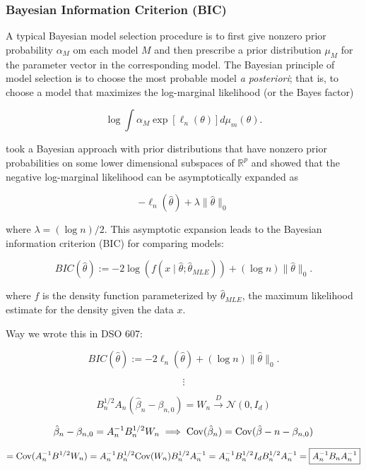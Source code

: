 \subsubsection{Bayesian Information Criterion (BIC)}\label{linreg.bic}

A typical Bayesian model selection procedure is to first give nonzero prior probability \(\alpha_M\) om each model \(M\) and then prescribe a prior distribution \(\mu_M\) for the parameter vector in the corresponding model. The Bayesian principle of model selection is to choose the most probable model \textit{a posteriori}; that is, to choose a model that maximizes the log-marginal likelihood (or the Bayes factor)

\[
\log \int \alpha_M \exp [ \ell_n (\theta)] d \mu_m(\theta).
\]

\citet{Schwarz1978} took a Bayesian approach with prior distributions that have nonzero prior probabilities on some lower dimensional subspaces of \(\mathbb{R}^p\) and showed that the negative log-marginal likelihood can be asymptotically expanded as 

\[
-\ell_n(\hat{\theta}) + \lambda \lVert \hat{\theta} \rVert_0
\]

where \(\lambda = (\log n)/2\). This asymptotic expansion leads to the Bayesian information criterion (BIC) for comparing models:

\[
BIC(\hat{\theta}) := -2 \log \left(f( x \mid \hat{\theta}; \hat{\theta}_{MLE}) \right) + (\log n) \lVert \hat{\theta} \rVert_0.
\]

where \(f\) is the density function parameterized by \( \hat{\theta}_{MLE}\), the maximum likelihood estimate for the density given the data \(x\). 


Way we wrote this in DSO 607:

\[
BIC(\hat{\theta}) := -2 \ell_n (\hat{\theta}) + (\log n) \lVert \hat{\theta} \rVert_0.
\]

\[
\vdots
\]


\[
B_n^{1/2} A_n(\hat{\beta}_n - \beta_{n,0} ) = W_n \xrightarrow{D} \mathcal{N}(0, I_d)
\]

\[
\hat{\beta}_n - \beta_{n,0} = A_n^{-1} B_n^{1/2} W_n \implies \Cov(\hat{\beta}_n) = \Cov(\hat{\beta}-n - \beta_{n,0})
\]

\[ 
= \Cov(A_n^{-1} B^{1/2} W_n) = A_n^{-1}B_n^{1/2} \Cov(W_n) B_n^{1/2} A_n^{-1} = A_n^{-1}B_n^{1/2} I_d B_n^{1/2} A_n^{-1} = \boxed{A_n^{-1} B_n A_n^{-1}}
\]

